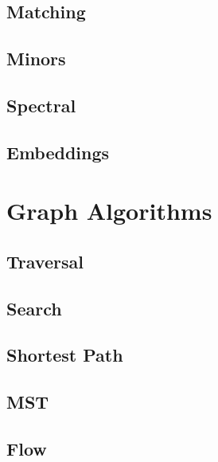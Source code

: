 \section{Matching}


\section{Minors}


\section{Spectral}


\section{Embeddings}


\chapter{Graph Algorithms}

\section{Traversal}


\section{Search}


\section{Shortest Path}


\section{MST}


\section{Flow}


